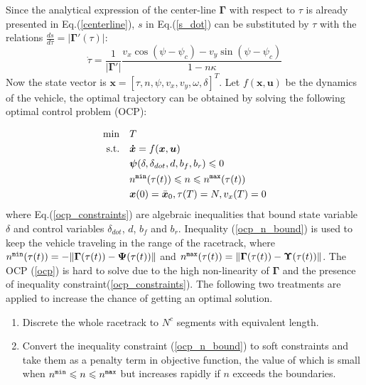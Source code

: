 \documentclass[conference, onecolumn]{IEEEtran}
\begin{document}
Since the analytical expression of the center-line $\mathbf{\Gamma}$ with respect to $\tau$ is already presented in Eq.(\ref{centerline}), $s$ in Eq.(\ref{s_dot}) can be substituted by $\tau$ with the relations $\frac{ds}{d\tau}=|\mathbf{\Gamma}'(\tau)|$:
\begin{equation}\label{tau_dot}
	\dot{\tau}  = \frac{1}{|\mathbf{\Gamma}'|}\frac{v_x \cos(\psi-\psi_c)-v_y \sin(\psi-\psi_c)}{1-n\kappa}
\end{equation}
Now the state vector is $\boldsymbol{x}=[\tau,n,\psi,v_x,v_y,\omega,\delta]^T$. Let $f(\boldsymbol{x},\boldsymbol{u})$ be the dynamics of the vehicle, the optimal trajectory can be obtained by solving the following optimal control problem (OCP):

\begin{subequations}
	\begin{align}
		\min \quad & T\\
		\textrm{s.t.} \quad & \boldsymbol{\dot{x}}=f(\boldsymbol{x},\boldsymbol{u})\\
		\quad &  \boldsymbol{\psi}(\delta,\delta_{dot},d,b_f,b_r)\leqslant 0  \label{ocp_constraints}\\
		\quad &  n^{\tt min}(\tau(t))\leqslant  n\leqslant  n^{\tt max}(\tau(t)) \label{ocp_n_bound}\\
		\quad & \boldsymbol{x}(0)=\bar{\boldsymbol{x}}_0,{\tau(T)}=N,{v_x(T)}=0
		\label{ocp}
	\end{align}
\end{subequations}
where Eq.(\ref{ocp_constraints}) are algebraic inequalities that bound state variable $\delta$ and control variables $\delta_{dot}$, $d$, $b_f$ and $b_r$. Inequality (\ref{ocp_n_bound}) is used to keep the vehicle traveling in the range of the racetrack, where $n^{\tt min}(\tau(t)) = -\|\mathbf{\Gamma}(\tau(t))-\mathbf{\Psi}(\tau(t))\|$ and $n^{\tt max}(\tau(t)) = \|\mathbf{\Gamma}(\tau(t))-\mathbf{\Upsilon}(\tau(t))\|$. 
The OCP (\ref{ocp}) is hard to solve due to the high non-linearity of $\mathbf{\Gamma}$ and the presence of inequality constraint(\ref{ocp_constraints}). The following two treatments are applied to increase the chance of getting an optimal solution.
\begin{enumerate}
	\item Discrete the whole racetrack to $N^c$ segments with equivalent length.
	\item Convert the inequality constraint (\ref{ocp_n_bound}) to soft constraints and take them as a penalty term in objective function, the value of which is small when $n^{\tt min}\leqslant  n\leqslant  n^{\tt max} $ but increases rapidly if $n$ exceeds the boundaries. 	 
\end{enumerate}
\end{document}

